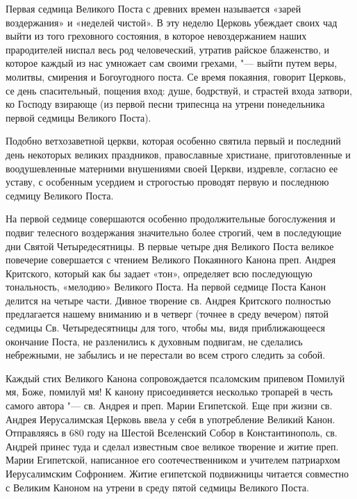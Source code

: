 


 

 

Первая седмица Великого Поста с древних времен называется «зарей воздержания» и «неделей чистой». В эту неделю Церковь убеждает своих чад выйти из того греховного состояния, в которое невоздержанием наших прародителей ниспал весь род человеческий, утратив райское блаженство, и которое каждый из нас умножает сам своими грехами, "--- выйти путем веры, молитвы, смирения и Богоугодного поста. Се время покаяния, говорит Церковь, се день спасительный, пощения вход: душе, бодрствуй, и страстей входа затвори, ко Господу взирающе  (из первой песни трипеснца на утрени понедельника первой седмицы Великого Поста).


Подобно ветхозаветной церкви, которая особенно святила первый и последний день некоторых великих праздников, православные христиане, приготовленные и воодушевленные матерними внушениями своей Церкви, издревле, согласно ее уставу, с особенным усердием и строгостью проводят первую и последнюю седмицу Великого Поста.


На первой седмице совершаются особенно продолжительные богослужения и подвиг телесного воздержания значительно более строгий, чем в последующие дни Святой Четыредесятницы. В первые четыре дня Великого Поста великое повечерие совершается с чтением Великого Покаянного Канона преп. Андрея Критского, который как бы задает «тон», определяет всю последующую тональность, «мелодию» Великого Поста. На первой седмице Поста Канон делится на четыре части. Дивное творение св. Андрея Критского полностью предлагается нашему вниманию и в четверг (точнее в среду вечером) пятой седмицы Св. Четыредесятницы для того, чтобы мы, видя приближающееся окончание Поста, не разленились к духовным подвигам, не сделались небрежными, не забылись и не перестали во всем строго следить за собой.


Каждый стих Великого Канона сопровождается псаломским припевом Помилуй мя, Боже, помилуй мя! К канону присоединяется несколько тропарей в честь самого автора "--- св. Андрея и преп. Марии Египетской. Еще при жизни св. Андрея Иерусалимская Церковь ввела у себя в употребление Великий Канон. Отправляясь в 680 году на Шестой Вселенский Собор в Константинополь, св. Андрей принес туда и сделал известным свое великое творение и житие преп. Марии Египетской, написанное его соотечественником и учителем патриархом Иерусалимским Софронием. Житие египетской подвижницы читается совместно с Великим Каноном на утрени в среду пятой седмицы Великого Поста.


